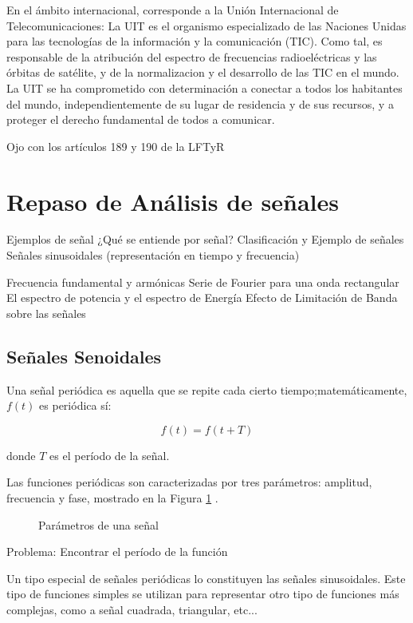 \documentclass[12pt,letterpaper,titlepage,twoside]{book}
\begin{document}
En el ámbito internacional, corresponde a la Unión Internacional de Telecomunicaciones: La UIT es el organismo especializado de las Naciones
Unidas para las tecnologías de la información y la
comunicación (TIC). Como tal, es responsable de la
atribución del espectro de frecuencias radioeléctricas
y las órbitas de satélite, y de la normalizacion y
el desarrollo de las TIC en el mundo. La UIT se ha
comprometido con determinación a conectar a todos
los habitantes del mundo, independientemente de su
lugar de residencia y de sus recursos, y a proteger el
derecho fundamental de todos a comunicar.


Ojo con los artículos 189 y 190 de la LFTyR
\section{Repaso de Análisis de señales}

Ejemplos de señal
¿Qué se entiende por señal?
Clasificación y Ejemplo de señales
Señales sinusoidales (representación en tiempo y frecuencia)

Frecuencia fundamental y armónicas
Serie de Fourier para una onda rectangular
El espectro de potencia y el espectro de Energía
Efecto de Limitación de Banda sobre las señales


\subsection{Señales Senoidales}
Una señal periódica es aquella que se repite cada cierto tiempo;matemáticamente, $f(t)$ es periódica sí:

\begin{equation}
f(t)  = f(t+T)
\end{equation}

donde $T$ es el período de la señal.

Las funciones periódicas son caracterizadas  por tres parámetros: amplitud, frecuencia y fase, mostrado en la Figura \ref{senal} . 

\begin{figure}
\begin{center}

\end{center}
\caption{Parámetros de una señal}\label{senal}
\end{figure}

Problema: 
Encontrar el período de la función 

Un tipo especial de señales periódicas lo constituyen las señales sinusoidales. Este tipo de funciones simples se utilizan para representar otro tipo de funciones más complejas, como a señal cuadrada, triangular, etc...
\end{document}
